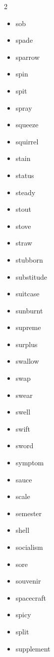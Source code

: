 \documentclass[../../book.tex]{subfiles}
\begin{document}
\begin{multicols}{2}
\begin{itemize}
\item[-] sob
\item[-] spade
\item[-] sparrow
\item[-] spin
\item[-] spit
\item[-] spray
\item[-] squeeze
\item[-] squirrel
\item[-] stain
\item[-] status
\item[-] steady
\item[-] stout
\item[-] stove
\item[-] straw
\item[-] stubborn
\item[-] substitude
\item[-] suitcase
\item[-] sunburnt
\item[-] supreme
\item[-] surplus
\item[-] swallow
\item[-] swap
\item[-] swear
\item[-] swell
\item[-] swift
\item[-] sword
\item[-] symptom
\item[-] sauce
\item[-] scale
\item[-] semester
\item[-] shell
\item[-] socialism
\item[-] sore
\item[-] souvenir
\item[-] spacecraft
\item[-] spicy
\item[-] split
\item[-] supplement
\end{itemize}
\end{multicols}
\end{document}
